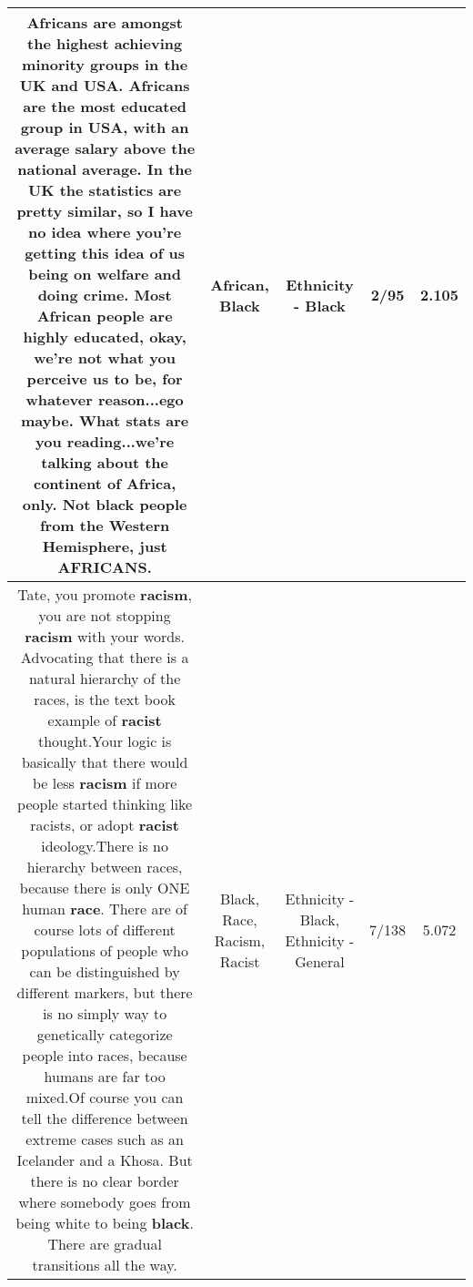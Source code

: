 \documentclass[11pt]{article}
\newlength\mylength
\begin{document}
\begin{center}
\begin{longtable}{|C{.65\mylength}|C{.30\mylength}|C{.12\mylength}|C{.12\mylength}|C{.12\mylength}|}
  \small Africans are amongst the highest achieving minority groups in the UK and USA. Africans are the most educated group in USA, with an average salary above the national average. In the UK the statistics are pretty similar, so I have no idea where you're getting this idea of us being on welfare and doing crime. Most \textbf{African} people are highly educated, okay, we're not what you perceive us to be, for whatever reason...ego maybe. What stats are you reading...we're talking about the continent of Africa, only. Not \textbf{black} people from the Western Hemisphere, just AFRICANS.\normalsize   & African, Black & Ethnicity - Black & 2/95 & 2.105 \\  \hline
  \small Tate, you promote \textbf{racism}, you are not stopping \textbf{racism} with your words. Advocating that there is a natural hierarchy of the races, is the text book example of \textbf{racist} thought.Your logic is basically that there would be less \textbf{racism} if more people started thinking like racists, or adopt \textbf{racist} ideology.There is no hierarchy between races, because there is only ONE human \textbf{race}. There are of course lots of different populations of people who can be distinguished by different markers, but there is no simply way to genetically categorize people into races, because humans are far too mixed.Of course you can tell the difference between extreme cases such as an Icelander and a Khosa. But there is no clear border where somebody goes from being white to being \textbf{black}. There are gradual transitions all the way.\normalsize   & Black, Race, Racism, Racist & Ethnicity - Black, Ethnicity - General & 7/138 & 5.072 \\  \hline

\end{longtable}
\end{center}
\end{document}
